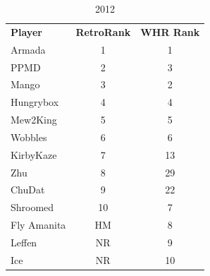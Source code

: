 \documentclass[10pt]{article}
\theoremstyle{definition}
\theoremstyle{remark}
\begin{document}
\begin{table}[!ht]
{}
    \parbox{.33 \textwidth}{
        \centering
        \caption{2012}
\begin{tabular}{lcc}
    \textbf{Player} & \textbf{RetroRank} & \textbf{WHR Rank} \\
    Armada          & 1                      & 1        \\
    PPMD            & 2                      & 3        \\
    Mango           & 3                      & 2        \\
    Hungrybox       & 4                      & 4        \\
    Mew2King        & 5                      & 5        \\
    Wobbles         & 6                      & 6        \\
    KirbyKaze       & 7                      & 13       \\
    Zhu             & 8                      & 29       \\
    ChuDat          & 9                      & 22       \\
    Shroomed        & 10                     & 7        \\
    Fly Amanita     & HM                     & 8        \\
    Leffen          & NR                     & 9        \\
    Ice             & NR                     & 10       \\
\end{tabular}
}

\end{table}
\end{document}
